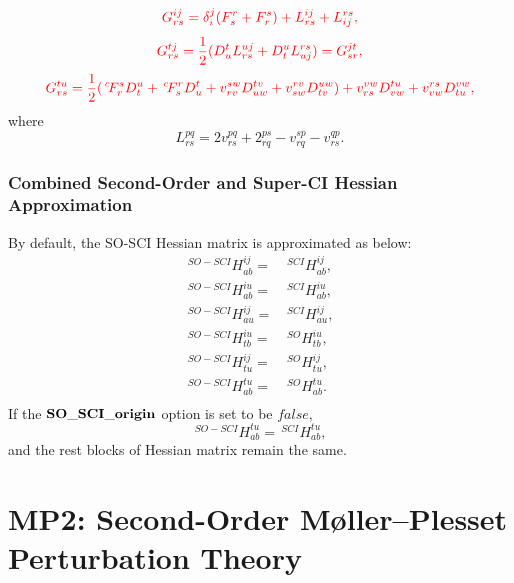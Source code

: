 \documentclass[a4paper,12pt,oneside]{book}
\newcommand{\red}[1]{{\color{red} #1}}
\newcommand{\pre}[1]{\,#1\!}
\begin{document}
\begin{equation}
\red{G^{ij}_{rs} = \delta_i^j(F^r_s+F^s_r)+L^{ij}_{rs} + L^{rs}_{ij},}
\end{equation}
\begin{equation}
\red{G^{tj}_{rs} = \frac{1}{2}(D^t_uL^{uj}_{rs} + D^u_tL^{rs}_{uj}) = G^{jt}_{sr},}
\end{equation}
\begin{equation}
\red{G^{tu}_{rs} = \frac{1}{2}( \pre{^c}F_r^sD_t^u + \pre{^c}F_s^rD_u^t  + v^{sw}_{rv}D^{tv}_{uw} + v^{rv}_{sw}D^{uw}_{tv})+v^{vw}_{rs}D^{tu}_{vw} + v_{vw}^{rs}D_{tu}^{vw},}
\end{equation}
where
\begin{equation}
  L^{pq}_{rs} = 2v^{pq}_{rs} +2^{ps}_{rq} - v^{sp}_{rq} - v^{qp}_{rs}.
\end{equation}

\subsection{Combined Second-Order and Super-CI Hessian Approximation}
By default, the SO-SCI Hessian matrix \cite{kreplinMCSCF2020} is approximated as below:
\begin{equation}
\begin{aligned}
\pre{^{SO-SCI}}H_{ab}^{ij} =& \pre{^{SCI}}H_{ab}^{ij},\\
\pre{^{SO-SCI}}H_{ab}^{iu} =& \pre{^{SCI}}H_{ab}^{iu},\\
\pre{^{SO-SCI}}H_{au}^{ij} =& \pre{^{SCI}}H_{au}^{ij},\\
\pre{^{SO-SCI}}H_{tb}^{iu} =& \pre{^{SO}}H_{tb}^{iu},\\
\pre{^{SO-SCI}}H_{tu}^{ij} =& \pre{^{SO}}H_{tu}^{ij},\\
\pre{^{SO-SCI}}H_{ab}^{tu} =& \pre{^{SO}}H_{ab}^{tu}.\\
\end{aligned}
\end{equation}
If the $\bf{SO\_SCI\_origin}$ option is set to be $false$, 
\begin{equation}
  \pre{^{SO-SCI}}H_{ab}^{tu} = \pre{^{SCI}}H_{ab}^{tu},
\end{equation}
and the rest blocks of Hessian matrix remain the same.

\chapter{MP2: Second-Order M{\o}ller--Plesset Perturbation Theory}
\label{ch:mp2}
\end{document}
